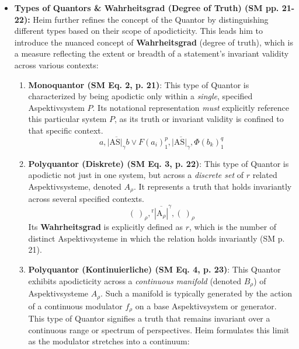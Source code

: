 \documentclass[12pt]{article}
\newcommand{\aspektivsystem}{P}
\begin{document}
\begin{itemize}
    \item \textbf{Types of Quantors \& Wahrheitsgrad (Degree of Truth) (SM pp. 21-22):}
    Heim further refines the concept of the Quantor by distinguishing different types based on their scope of apodicticity. This leads him to introduce the nuanced concept of \textbf{Wahrheitsgrad} (degree of truth), which is a measure reflecting the extent or breadth of a statement's invariant validity across various contexts:
    \begin{enumerate}
        \item \textbf{Monoquantor (SM Eq. 2, p. 21)}: This type of Quantor is characterized by being apodictic only within a \textit{single}, specified Aspektivsystem \( \aspektivsystem \). Its notational representation \textit{must} explicitly reference this particular system \( \aspektivsystem \), as its truth or invariant validity is confined to that specific context.
        \begin{equation}
        a, \overline{|\mathrm{AS}|_{\gamma}} b \lor F(a_i)^p_1 , \overline{|\mathrm{AS}|_{\gamma}} , \Phi(b_k)^q_1
        \label{eq:monoquantor_full}
        \tag{2}
        \end{equation}
        \item \textbf{Polyquantor (Diskrete) (SM Eq. 3, p. 22)}: This type of Quantor is apodictic not just in one system, but across a \textit{discrete set} of \( r \) related Aspektivsysteme, denoted \( A_\rho \). It represents a truth that holds invariantly across several specified contexts.
        \begin{equation}
        (\ )_\rho, \left. {}^{\mathrm{r}} \overline{\left| \mathrm{A}_\rho \right|} \right.^\gamma, (\ )_\rho
        \label{eq:polyquantor_discrete_full}
        \tag{3}
        \end{equation}
        Its \textbf{Wahrheitsgrad} is explicitly defined as \( r \), which is the number of distinct Aspektivsysteme in which the relation holds invariantly (SM p. 21).
        \item \textbf{Polyquantor (Kontinuierliche) (SM Eq. 4, p. 23)}: This Quantor exhibits apodicticity across a \textit{continuous manifold} (denoted \( B_\rho \)) of Aspektivsysteme \( A_\rho \). Such a manifold is typically generated by the action of a continuous modulator \( f_\rho \) on a base Aspektivsystem or generator. This type of Quantor signifies a truth that remains invariant over a continuous range or spectrum of perspectives. Heim formulates this limit as the modulator stretches into a continuum:
        \begin{equation}

\end{equation}
\end{enumerate}
\end{itemize}
\end{document}
